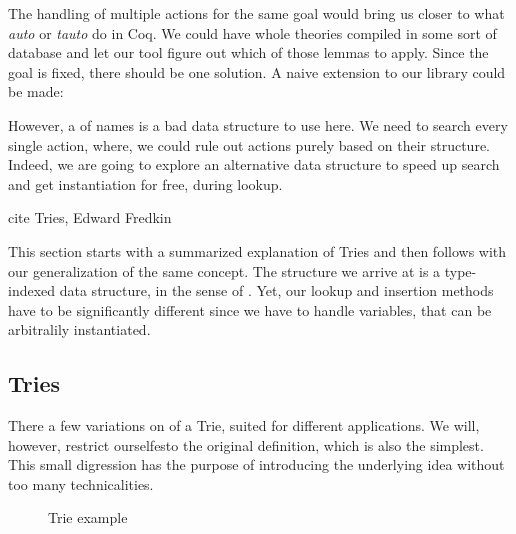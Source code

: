 The handling of multiple actions for the same goal would bring us closer to what
\emph{auto} or \emph{tauto} do in Coq. We could have whole theories compiled in some sort
of database and let our tool figure out which of those lemmas to apply. Since the goal is
fixed, there should be one solution. A naive extension to our library could be made:


However, a  of names is a bad data structure to use here. We need to search
every single action, where, we could rule out actions purely based on their structure.
Indeed, we are going to explore an alternative data structure to speed up search and get
instantiation for free, during lookup.

\begin{TODO}
  \item cite Tries, Edward Fredkin
\end{TODO}

This section starts with a summarized explanation of Tries and then follows with our
generalization of the same concept. The structure we arrive at is a type-indexed data structure,
in the sense of \cite{Hinze04}. Yet, our lookup and insertion methods have to be significantly different
since we have to handle variables, that can be arbitralily instantiated.

\subsection{Tries}

There a few variations on of a Trie, suited for different applications. We will, however,
restrict ourselfesto the original definition, which is also the simplest. This small digression
has the purpose of introducing the underlying idea without too many technicalities.

\begin{wrapfigure}{r}{0.30\textwidth}
\begin{center}
\end{center}
\caption{Trie example}
\label{fig:firsttrie}
\end{wrapfigure}

